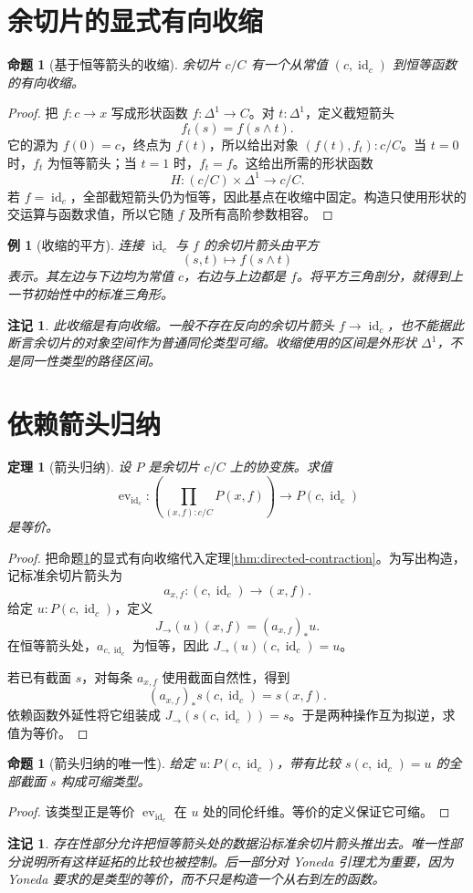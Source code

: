 \documentclass[12pt,oneside,openany,fontset=none]{ctexbook}
\theoremstyle{cn}
\newtheorem{example}[definition]{例}
\newtheorem{proposition}[definition]{命题}
\newtheorem{theorem}[definition]{定理}
\newtheorem{remark}[definition]{注记}
\numberwithin{equation}{chapter}
\newcommand{\id}{\operatorname{id}}
\newcommand{\ev}{\operatorname{ev}}
\begin{document}
\section{余切片的显式有向收缩}
\begin{proposition}[基于恒等箭头的收缩]\label{prop:coslice-contraction}
余切片 $c/C$ 有一个从常值 $(c,\id_c)$ 到恒等函数的有向收缩。
\end{proposition}
\begin{proof}
把 $f:c\to x$ 写成形状函数 $f:\Delta^1\to C$。对 $t:\Delta^1$，定义截短箭头
\[
f_t(s)=f(s\wedge t).
\]
它的源为 $f(0)=c$，终点为 $f(t)$，所以给出对象 $(f(t),f_t):c/C$。当 $t=0$ 时，$f_t$ 为恒等箭头；当 $t=1$ 时，$f_t=f$。这给出所需的形状函数
\[
H:(c/C)\times\Delta^1\longrightarrow c/C.
\]
若 $f=\id_c$，全部截短箭头仍为恒等，因此基点在收缩中固定。构造只使用形状的交运算与函数求值，所以它随 $f$ 及所有高阶参数相容。
\end{proof}
\begin{example}[收缩的平方]
连接 $\id_c$ 与 $f$ 的余切片箭头由平方
\[
(s,t)\longmapsto f(s\wedge t)
\]
表示。其左边与下边均为常值 $c$，右边与上边都是 $f$。将平方三角剖分，就得到上一节初始性中的标准三角形。
\end{example}
\begin{remark}
此收缩是有向收缩。一般不存在反向的余切片箭头 $f\to\id_c$，也不能据此断言余切片的对象空间作为普通同伦类型可缩。收缩使用的区间是外形状 $\Delta^1$，不是同一性类型的路径区间。
\end{remark}

\section{依赖箭头归纳}
\begin{theorem}[箭头归纳]\label{thm:arrow-induction}
设 $P$ 是余切片 $c/C$ 上的协变族。求值
\[
\ev_{\id_c}:
\left(\prod_{(x,f):c/C}P(x,f)\right)
\longrightarrow P(c,\id_c)
\]
是等价。
\end{theorem}
\begin{proof}
把命题\ref{prop:coslice-contraction}的显式有向收缩代入定理\ref{thm:directed-contraction}。为写出构造，记标准余切片箭头为
\[
a_{x,f}:(c,\id_c)\longrightarrow(x,f).
\]
给定 $u:P(c,\id_c)$，定义
\[
J_{\to}(u)(x,f)=(a_{x,f})_*u.
\]
在恒等箭头处，$a_{c,\id_c}$ 为恒等，因此
$J_{\to}(u)(c,\id_c)=u$。

若已有截面 $s$，对每条 $a_{x,f}$ 使用截面自然性，得到
\[
(a_{x,f})_*s(c,\id_c)=s(x,f).
\]
依赖函数外延性将它组装成 $J_{\to}(s(c,\id_c))=s$。于是两种操作互为拟逆，求值为等价。
\end{proof}
\begin{proposition}[箭头归纳的唯一性]
给定 $u:P(c,\id_c)$，带有比较 $s(c,\id_c)=u$ 的全部截面 $s$ 构成可缩类型。
\end{proposition}
\begin{proof}
该类型正是等价 $\ev_{\id_c}$ 在 $u$ 处的同伦纤维。等价的定义保证它可缩。
\end{proof}
\begin{remark}
存在性部分允许把恒等箭头处的数据沿标准余切片箭头推出去。唯一性部分说明所有这样延拓的比较也被控制。后一部分对 Yoneda 引理尤为重要，因为 Yoneda 要求的是类型的等价，而不只是构造一个从右到左的函数。
\end{remark}
\end{document}

